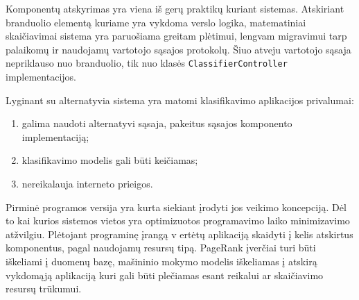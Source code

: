 Komponentų atskyrimas yra viena iš gerų praktikų kuriant sistemas. Atskiriant branduolio elementą kuriame yra
vykdoma verslo logika, matematiniai skaičiavimai sistema yra paruošiama greitam plėtimui, lengvam migravimui
tarp palaikomų ir naudojamų vartotojo sąsajos protokolų. Šiuo atveju vartotojo sąsaja nepriklauso nuo
branduolio, tik nuo klasės \texttt{ClassifierController} implementacijos.

Lyginant su alternatyvia sistema \cite{gapi} yra matomi klasifikavimo aplikacijos privalumai:
 \begin{enumerate}
    \item galima naudoti alternatyvi sąsaja, pakeitus sąsajos komponento implementaciją;
    \item klasifikavimo modelis gali būti keičiamas;
    \item nereikalauja interneto prieigos.
 \end{enumerate}

Pirminė programos versija yra kurta siekiant įrodyti jos veikimo koncepciją. Dėl to kai kurios sistemos vietos
yra optimizuotos programavimo laiko minimizavimo atžvilgiu. Plėtojant programinę įrangą v ertėtų aplikaciją
skaidyti į kelis atskirtus komponentus, pagal naudojamų resursų tipą. PageRank įverčiai turi būti iškeliami
į duomenų bazę, mašininio mokymo modelis iškeliamas į atskirą vykdomąją aplikaciją kuri gali būti plečiamas
esant reikalui ar skaičiavimo resursų trūkumui.